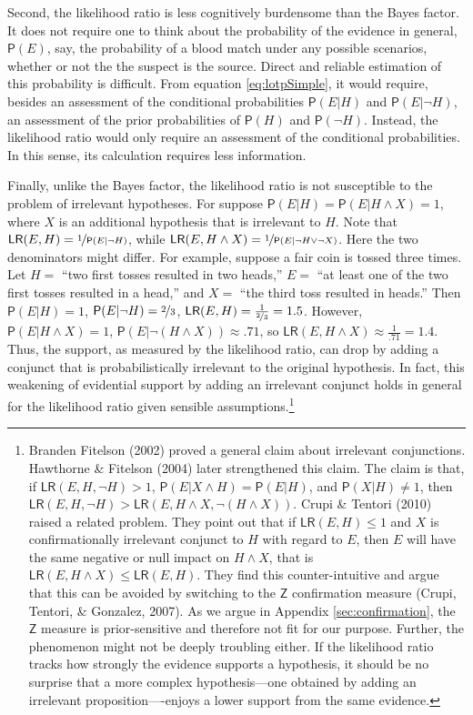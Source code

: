 \documentclass[
  10pt,
  dvipsnames,enabledeprecatedfontcommands]{scrartcl}
\newcommand{\n}{\neg}
\newcommand{\et}{\wedge}
\newcommand{\pr}[1]{\mathsf{P}(#1)}
\begin{document}
Second, the likelihood ratio is less cognitively burdensome than the
Bayes factor. It does not require one to think about the probability of
the evidence in general, \(\pr{E}\), say, the probability of a blood
match under any possible scenarios, whether or not the the suspect is
the source. Direct and reliable estimation of this probability is
difficult. From equation \eqref{eq:lotpSimple}, it would require,
besides an assessment of the conditional probabilities \(\pr{E\vert H}\)
and \(\pr{E\vert \neg H}\), an assessment of the prior probabilities of
\(\pr{H}\) and \(\pr{\neg H}\). Instead, the likelihood ratio would only
require an assessment of the conditional probabilities. In this sense,
its calculation requires less information.

Finally, unlike the Bayes factor, the likelihood ratio is not
susceptible to the problem of irrelevant hypotheses. For suppose
\(\pr{E\vert H} = \pr{E\vert H \et X} = 1\), where \(X\) is an
additional hypothesis that is irrelevant to \(H\). Note that
\(\mathsf{LR}(E,H) = \nicefrac{1}{\pr{E \vert \n H}}\), while
\(\mathsf{LR}(E, H \et X) = \nicefrac{1}{\pr{E \vert \n H \vee \n X}}\).
Here the two denominators might differ. For example, suppose a fair coin
is tossed three times. Let \(H=\) ``two first tosses resulted in two
heads,'' \(E=\) ``at least one of the two first tosses resulted in a
head,'' and \(X=\) ``the third toss resulted in heads.'' Then
\(\pr{E \vert H} =1\), \(\pr{E\vert \n H} = \nicefrac{2}{3}\),
\(\mathsf{LR}(E,H) = \frac{1}{\nicefrac{2}{3}} = 1.5\). However,
\(\pr{E\vert H \et X} =1\), \(\pr{E \vert \n (H \et X)} \approx .71\),
so \(\mathsf{LR}(E,H \et X) \approx \frac{1}{.71} = 1.4\). Thus, the
support, as measured by the likelihood ratio, can drop by adding a
conjunct that is probabilistically irrelevant to the original
hypothesis. In fact, this weakening of evidential support by adding an
irrelevant conjunct holds in general for the likelihood ratio given
sensible assumptions.\footnote{Branden Fitelson (2002) proved a general
  claim about irrelevant conjunctions. Hawthorne \& Fitelson (2004)
  later strengthened this claim. The claim is that, if
  \(\mathsf{LR}(E,H,\n H)>1\),
  \(\pr{E \vert X \et H} = \pr{E \vert H}\), and
  \(\pr{X \vert H} \neq 1\), then
  \(\mathsf{LR}(E,H,\n H) > \mathsf{LR}(E,H \et X,\n(H \et X))\). Crupi
  \& Tentori (2010) raised a related problem. They point out that if
  \(\mathsf{LR}(E,H)\leq 1\) and \(X\) is confirmationally irrelevant
  conjunct to \(H\) with regard to \(E\), then \(E\) will have the same
  negative or null impact on \(H \et X\), that is
  \(\mathsf{LR}(E,H \et X ) \leq \mathsf{LR}(E,H)\). They find this
  counter-intuitive and argue that this can be avoided by switching to
  the \(\mathsf{Z}\) confirmation measure (Crupi, Tentori, \& Gonzalez,
  2007). As we argue in Appendix \ref{sec:confirmation}, the
  \(\mathsf{Z}\) measure is prior-sensitive and therefore not fit for
  our purpose. Further, the phenomenon might not be deeply troubling
  either. If the likelihood ratio tracks how strongly the evidence
  supports a hypothesis, it should be no surprise that a more complex
  hypothesis---one obtained by adding an irrelevant
  proposition----enjoys a lower support from the same evidence.}
\end{document}
